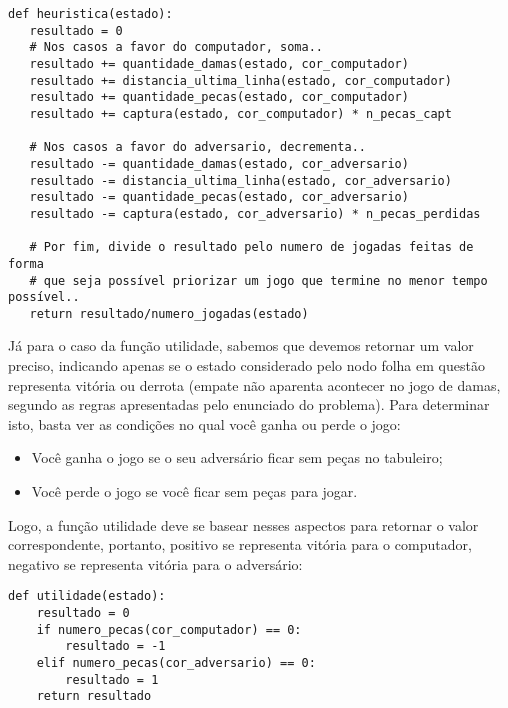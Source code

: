 \documentclass{article}
\begin{document}
    \begin{verbatim}
def heuristica(estado):
   resultado = 0
   # Nos casos a favor do computador, soma..
   resultado += quantidade_damas(estado, cor_computador)
   resultado += distancia_ultima_linha(estado, cor_computador)
   resultado += quantidade_pecas(estado, cor_computador)
   resultado += captura(estado, cor_computador) * n_pecas_capt
   
   # Nos casos a favor do adversario, decrementa..
   resultado -= quantidade_damas(estado, cor_adversario)
   resultado -= distancia_ultima_linha(estado, cor_adversario)
   resultado -= quantidade_pecas(estado, cor_adversario)
   resultado -= captura(estado, cor_adversario) * n_pecas_perdidas
   
   # Por fim, divide o resultado pelo numero de jogadas feitas de forma 
   # que seja possível priorizar um jogo que termine no menor tempo possível..
   return resultado/numero_jogadas(estado)
    \end{verbatim}

    Já para o caso da função utilidade, sabemos que devemos retornar um valor
    preciso, indicando apenas se o estado considerado pelo nodo folha em
    questão representa vitória ou derrota (empate não aparenta acontecer no
    jogo de damas, segundo as regras apresentadas pelo enunciado do problema).
    Para determinar isto, basta ver as condições no qual você ganha ou perde o
    jogo:

    \begin{itemize}
        \item Você ganha o jogo se o seu adversário ficar sem peças no
            tabuleiro;
        \item Você perde o jogo se você ficar sem peças para jogar.
    \end{itemize}

    Logo, a função utilidade deve se basear nesses aspectos para retornar o
    valor correspondente, portanto, positivo se representa vitória para o
    computador, negativo se representa vitória para o adversário:

    \begin{verbatim}
def utilidade(estado):
    resultado = 0
    if numero_pecas(cor_computador) == 0:
        resultado = -1
    elif numero_pecas(cor_adversario) == 0:
        resultado = 1
    return resultado
    \end{verbatim}
\end{document}
